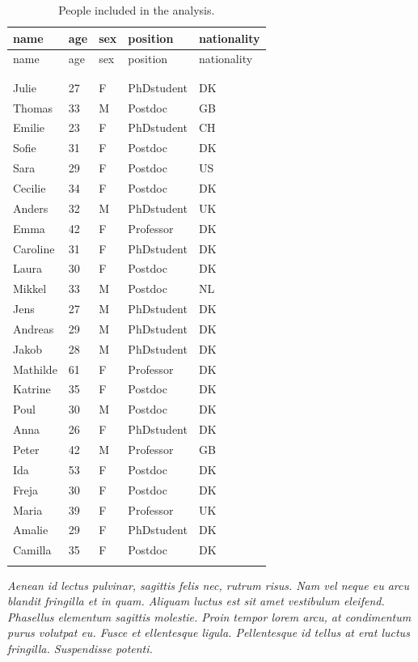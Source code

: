 \documentclass[
  a4paper,
]{scrbook}
\begin{document}
\begin{longtable}[]{@{}lllll@{}}

\toprule\noalign{}
name & age & sex & position & nationality \\
\midrule\noalign{}
\endfirsthead
\toprule\noalign{}
name & age & sex & position & nationality \\
\midrule\noalign{}
\endhead
\bottomrule\noalign{}
\tabularnewline
\caption{}\label{T_fd8c9}\tabularnewline
\endlastfoot
Julie & 27 & F & PhDstudent & DK \\
Thomas & 33 & M & Postdoc & GB \\
Emilie & 23 & F & PhDstudent & CH \\
Sofie & 31 & F & Postdoc & DK \\
Sara & 29 & F & Postdoc & US \\
Cecilie & 34 & F & Postdoc & DK \\
Anders & 32 & M & PhDstudent & UK \\
Emma & 42 & F & Professor & DK \\
Caroline & 31 & F & PhDstudent & DK \\
Laura & 30 & F & Postdoc & DK \\
Mikkel & 33 & M & Postdoc & NL \\
Jens & 27 & M & PhDstudent & DK \\
Andreas & 29 & M & PhDstudent & DK \\
Jakob & 28 & M & PhDstudent & DK \\
Mathilde & 61 & F & Professor & DK \\
Katrine & 35 & F & Postdoc & DK \\
Poul & 30 & M & Postdoc & DK \\
Anna & 26 & F & PhDstudent & DK \\
Peter & 42 & M & Professor & GB \\
Ida & 53 & F & Postdoc & DK \\
Freja & 30 & F & Postdoc & DK \\
Maria & 39 & F & Professor & UK \\
Amalie & 29 & F & PhDstudent & DK \\
Camilla & 35 & F & Postdoc & DK \\


\caption{\label{tbl-subjects}People included in the analysis.}

\tabularnewline
\end{longtable}

\emph{Aenean id lectus pulvinar, sagittis felis nec, rutrum risus. Nam
vel neque eu arcu blandit fringilla et in quam. Aliquam luctus est sit
amet vestibulum eleifend. Phasellus elementum sagittis molestie. Proin
tempor lorem arcu, at condimentum purus volutpat eu. Fusce et
ellentesque ligula. Pellentesque id tellus at erat luctus fringilla.
Suspendisse potenti.}
\end{document}
